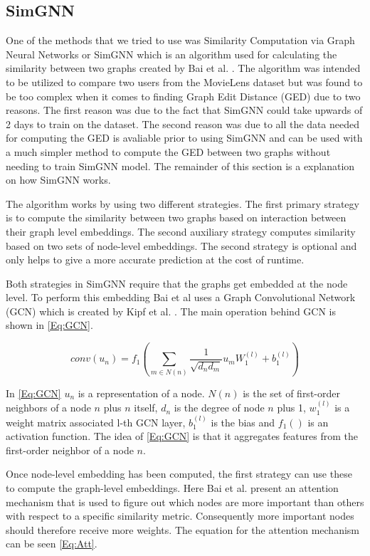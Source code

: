 \subsection{SimGNN}\label{AP:SimGNN}
One of the methods that we tried to use was Similarity Computation via Graph Neural Networks or SimGNN which is an algorithm used for calculating the similarity between two graphs created by Bai et al. \cite{Bai2018}. The algorithm was intended to be utilized to compare two users from the MovieLens dataset but was found to be too complex when it comes to finding Graph Edit Distance (GED) due to two reasons. The first reason was due to the fact that SimGNN could take upwards of 2 days to train on the dataset. The second reason was due to all the data needed for computing the GED is avaliable prior to using SimGNN and can be used with a much simpler method to compute the GED between two graphs without needing to train SimGNN model. The remainder of this section is a explanation on how SimGNN works.


The algorithm works by using two different strategies. The first primary strategy is to compute the similarity between two graphs based on interaction between their graph level embeddings. The second auxiliary strategy computes similarity based on two sets of node-level embeddings. The second strategy is optional and only helps to give a more accurate prediction at the cost of runtime\cite{Bai2018}.

Both strategies in SimGNN require that the graphs get embedded at the node level. To perform this embedding Bai et al uses a Graph Convolutional Network (GCN)\cite{Bai2018} which is created by Kipf et al. \cite{Kipf2016}. The main operation behind GCN is shown in \autoref{Eq:GCN}.


\begin{equation}\label{Eq:GCN}
conv(u_n)=f_1(\sum_{m \in N(n)} \frac{1}{\sqrt{d_nd_m}}u_mW_1^{(l)}+b_1^{(l)})
\end{equation}

In \autoref{Eq:GCN} $u_n$ is a representation of a node. $N(n)$ is the set of first-order neighbors of a node $n$ plus $n$ itself, $d_n$ is the degree of node $n$ plus 1, $w_1^{(l)}$ is a weight matrix associated l-th GCN layer, $b_1^{(l)}$ is the bias and $f_1()$ is an activation function. The idea of \autoref{Eq:GCN} is that it aggregates features from the first-order neighbor of a node $n$\cite{Bai2018}.


Once node-level embedding has been computed, the first strategy can use these to compute the graph-level embeddings. Here Bai et al. present an attention mechanism that is used to figure out which nodes are more important than others with respect to a specific similarity metric. Consequently more important nodes should therefore receive more weights\cite{Bai2018}. The equation for the attention mechanism can be seen \autoref{Eq:Att}.



